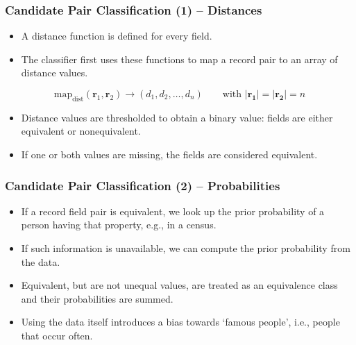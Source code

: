 \documentclass[12pt]{beamer}
\theoremstyle{break}
\begin{document}
\begin{frame}
	\frametitle{Candidate Pair Classification (1) -- Distances}
	
	\begin{itemize}
		\item A distance function is defined for every field.
		\item The classifier first uses these functions to map a record pair to an array of distance values.
	\end{itemize}
	
	\vspace{-8mm}
	
	\begin{equation*}
		\mathrm{map}_{\mathrm{dist}}(\bm{r}_1, \bm{r}_2) \to (d_1, d_2, \ldots, d_n)	 \qquad \text{with } \left\vert \bm{r_1} \right\vert = \left\vert \bm{r_2} \right\vert = n
	\end{equation*}
	
	\pause
	
	\begin{itemize}
		\item Distance values are thresholded to obtain a binary value: fields are either \alert{equivalent} or \alert{nonequivalent}.
		\item If one or both values are missing, the fields are considered equivalent.
	\end{itemize}

\end{frame}




\begin{frame}
	\frametitle{Candidate Pair Classification (2) -- Probabilities}
	
	\begin{itemize}
		\item If a record field pair is equivalent, we look up the \alert{prior probability} of a person having that property, e.g., in a census.
		\item If such information is unavailable, we can compute the prior probability from the data.
		\item Equivalent, but are not unequal values, are treated as an \alert{equivalence class} and their probabilities are summed.
		\item Using the data itself introduces a bias towards `famous people', i.e., people that occur often.
	\end{itemize}

\end{frame}
\end{document}
